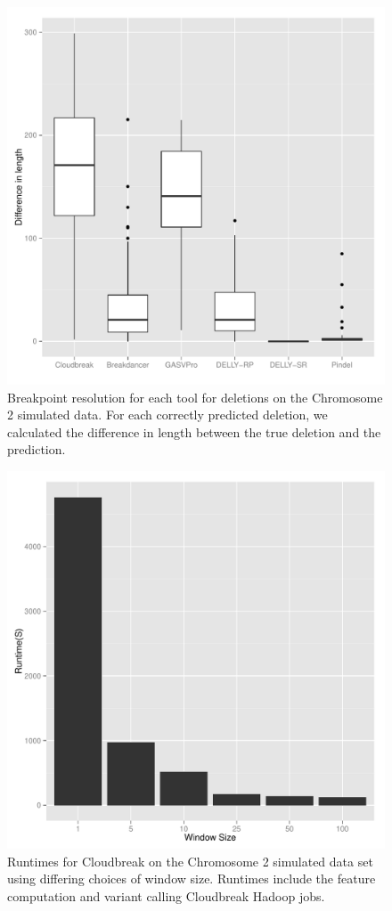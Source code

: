 \documentclass[11pt]{article}
\begin{document}
\begin{figure}
\centering
\includegraphics[width=1\textwidth]{../../figures/breakpoint_resolution.pdf}
\caption{Breakpoint resolution for each tool for deletions on the Chromosome 2 simulated data. For each correctly predicted deletion, we calculated the difference in length between the true deletion and the prediction.}
\label{breakpoint_resolution}
\end{figure}

\clearpage

\begin{figure}
\centering
\includegraphics[width=.8\textwidth]{../../figures/runtime_by_windowSize.pdf}
\caption[Cloudbreak runtimes with varying window sizes.]{Runtimes for Cloudbreak on the Chromosome 2 simulated data set using differing choices of window size. Runtimes include the feature computation and variant calling Cloudbreak Hadoop jobs.}
\label{figure_runtime_by_window_size}
\end{figure}
\end{document}
